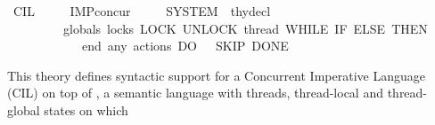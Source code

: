 %
\begin{isabellebody}%
%
%
\isadelimdocument
%
\endisadelimdocument
%
\isatagdocument
%
\isamarkuptrue%
%
\endisatagdocument
{\isafolddocument}%
%
\isadelimdocument
%
\endisadelimdocument
%
\isadelimtheory
%
\endisadelimtheory
%
\isatagtheory
{}\isamarkupfalse%
\ CIL\isanewline
\ \ \ \ \ {\isachardoublequoteopen}IMP{\isacharunderscore}{\kern0pt}concur{\isachardoublequoteclose}\ \isanewline
\ \ \ \ {\isachardoublequoteopen}SYSTEM{\isachardoublequoteclose}\ {\isacharcolon}{\kern0pt}{\isacharcolon}{\kern0pt}\ thy{\isacharunderscore}{\kern0pt}decl\isanewline
\ \ \ \ \ \ \ \ \ {\isachardoublequoteopen}globals{\isachardoublequoteclose}\ {\isachardoublequoteopen}locks{\isachardoublequoteclose}\ {\isachardoublequoteopen}LOCK{\isachardoublequoteclose}\ {\isachardoublequoteopen}UNLOCK{\isachardoublequoteclose}\ {\isachardoublequoteopen}thread{\isachardoublequoteclose}\ {\isachardoublequoteopen}WHILE{\isachardoublequoteclose}\ {\isachardoublequoteopen}IF{\isachardoublequoteclose}\ {\isachardoublequoteopen}ELSE{\isachardoublequoteclose}\ {\isachardoublequoteopen}THEN{\isachardoublequoteclose}\isanewline
\ \ \ \ \ \ \ \ \ \ \ \ {\isachardoublequoteopen}end{\isacharsemicolon}{\kern0pt}{\isachardoublequoteclose}\ {\isachardoublequoteopen}any{\isachardoublequoteclose}\ {\isachardoublequoteopen}actions{\isachardoublequoteclose}\ {\isachardoublequoteopen}DO{\isachardoublequoteclose}\ {\isachardoublequoteopen}{\isacharless}{\kern0pt}{\isacharminus}{\kern0pt}{\isachardoublequoteclose}\ {\isachardoublequoteopen}{\isacharminus}{\kern0pt}{\isachargreater}{\kern0pt}{\isachardoublequoteclose}\ {\isachardoublequoteopen}SKIP{\isachardoublequoteclose}\ {\isachardoublequoteopen}DONE{\isachardoublequoteclose}\isanewline
\ \isanewline
{}%
\endisatagtheory
{\isafoldtheory}%
%
\isadelimtheory
%
\endisadelimtheory
%
\isadelimdocument
%
\endisadelimdocument
%
\isatagdocument
%
\isamarkuptrue%
%
\endisatagdocument
{\isafolddocument}%
%
\isadelimdocument
%
\endisadelimdocument
%
\begin{isamarkuptext}%
This theory defines syntactic support for a Concurrent Imperative Language (CIL) on top of
, a semantic language with threads, thread-local and thread-global states on which 

\end{isamarkuptext}
\end{isabellebody}
